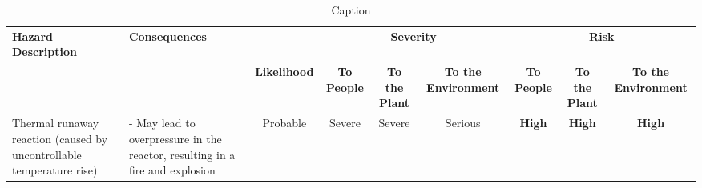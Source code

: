 \begin{table}
    \centering\footnotesize
    \caption{Caption}
    \label{tab:my_label}
\begin{adjustbox}{max width=\linewidth}
\begin{tabularx}{\linewidth}{|p{3cm}|p{8cm}|c|c|c|c|c|c|c|}

                                                                                                                       \textbf{Hazard Description}  & \textbf{Consequences}                                                                                                                                                                                                                                                                                                                                                                          &                                       & \multicolumn{3}{c|}{\textbf{Severity}}                                                                                                                                                                  & \multicolumn{3}{c|}{\textbf{Risk}}                                                                                                                                                                       \\ \cline{4-9} 
                                                                                     & \multicolumn{1}{c|}{\multirow{-2}{*}{}}                                                                                                                                                                                                                                                                                                                                   & \multirow{-2}{*}{\textbf{Likelihood}} & \textbf{To  People} & \textbf{To the Plant} & \textbf{To the Environment} & \textbf{To  People} & \textbf{To the Plant} & \textbf{To the  Environment}\\
Thermal runaway  reaction  (caused by  uncontrollable  temperature rise) & - May lead to overpressure in the reactor,    resulting in a fire and explosion                                                                                                                                                                                                                                                                      & Probable                              & Severe                                                        & Severe                                                          & Serious                                                               & \cellcolor[HTML]{FD6864}\textbf{High}                         & \cellcolor[HTML]{FD6864}\textbf{High}                           & \cellcolor[HTML]{FD6864}\textbf{High}                                   \\

\end{tabularx}
\end{adjustbox}
\end{table}
